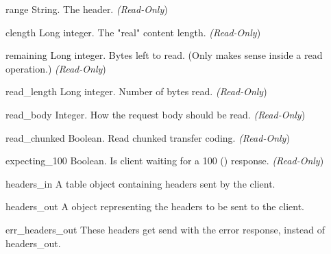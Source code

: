 
\begin{memberdesc}[Request]{range}
String. The  header.
\emph{(Read-Only})
\end{memberdesc}

\begin{memberdesc}[Request]{clength}
Long integer. The "real" content length.
\emph{(Read-Only})
\end{memberdesc}

\begin{memberdesc}[Request]{remaining}
Long integer. Bytes left to read. (Only makes sense inside a read
operation.)
\emph{(Read-Only})
\end{memberdesc}

\begin{memberdesc}[Request]{read_length}
Long integer. Number of bytes read.
\emph{(Read-Only})
\end{memberdesc}

\begin{memberdesc}[Request]{read_body}
Integer. How the request body should be read.
\emph{(Read-Only})
\end{memberdesc}

\begin{memberdesc}[Request]{read_chunked}
Boolean. Read chunked transfer coding.
\emph{(Read-Only})
\end{memberdesc}

\begin{memberdesc}[Request]{expecting_100}
Boolean. Is client waiting for a 100 () response.
\emph{(Read-Only})
\end{memberdesc}

\begin{memberdesc}[Request]{headers_in}
A table object containing headers sent by the client.
\end{memberdesc}

\begin{memberdesc}[Request]{headers_out}
A  object representing the headers to be sent to the
client. 
\end{memberdesc}

\begin{memberdesc}[Request]{err_headers_out}
These headers get send with the error response, instead of
headers_out.
\end{memberdesc}

